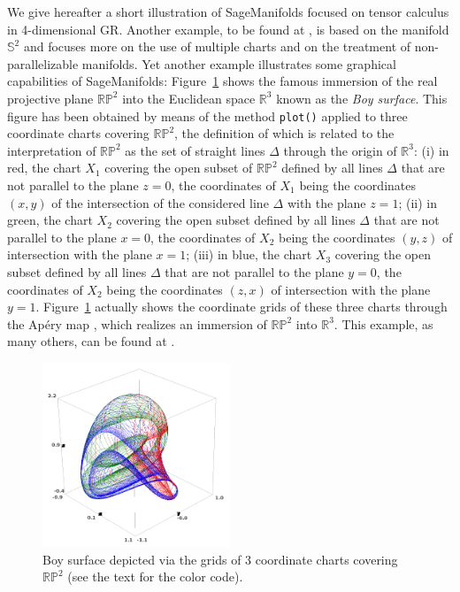 \documentclass[a4paper]{jpconf}
\newcommand{\soft}[1]{\textsf{#1}}
\newcommand{\code}[1]{\texttt{#1}}
\newcommand{\SM}{\soft{SageManifolds}}
\begin{document}
We give hereafter a short illustration of \SM{} focused on tensor 
calculus in 4-dimensional GR.
Another example, to be found at \cite{SM_examples}, is
based on the manifold $\mathbb{S}^2$ and 
focuses more on the use of multiple charts and on the treatment of non-parallelizable 
manifolds. Yet another example illustrates some graphical capabilities of
\SM{}: Figure~\ref{f:boy} shows the famous
immersion of the real projective plane $\mathbb{RP}^2$ into
the Euclidean space $\mathbb{R}^3$ known as the \emph{Boy surface}.
This figure has been obtained by means of the method \code{plot()} applied
to three coordinate charts covering $\mathbb{RP}^2$,
the definition of which is related to the interpretation of
$\mathbb{RP}^2$ as the set of straight lines $\Delta$
through the origin of $\mathbb{R}^3$:
(i) in red, the chart $X_1$ covering the open subset of $\mathbb{RP}^2$ defined
by all lines $\Delta$ that are not parallel to the plane $z=0$,
the coordinates of $X_1$ being the coordinates $(x,y)$ of the intersection of
the considered line $\Delta$ with the plane $z=1$;
(ii) in green, the chart $X_2$ covering the open subset defined
by all lines $\Delta$ that are not parallel to the plane $x=0$,
the coordinates of $X_2$ being the coordinates $(y,z)$ of intersection  with the plane $x=1$;
(iii) in blue, the chart $X_3$ covering the open subset defined
by all lines $\Delta$ that are not parallel to the plane $y=0$,
the coordinates of $X_2$ being the coordinates $(z,x)$ of intersection with the plane $y=1$.
Figure~\ref{f:boy} actually shows the coordinate grids of these three
charts through the Ap\'ery map \cite{Apery86}, which realizes an immersion
of $\mathbb{RP}^2$ into $\mathbb{R}^3$. This example, as many others,
can be found at \cite{SM_examples}.

\begin{figure}
\begin{center}
\includegraphics[width=0.5\textwidth]{boy_surface.png}
\end{center}
\caption{\label{f:boy} Boy surface depicted via the grids of
3 coordinate charts covering
$\mathbb{RP}^2$ (see the text for the color code).}
\end{figure}
\end{document}
